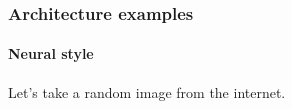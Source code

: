 \documentclass[9pt]{beamer}
\begin{document}
\begin{frame}
  \frametitle{Architecture examples}

  \framesubtitle{Neural style}
  
  Let's take a random image from the internet.

  \begin{center}
  \end{center}
\end{frame}
\end{document}
